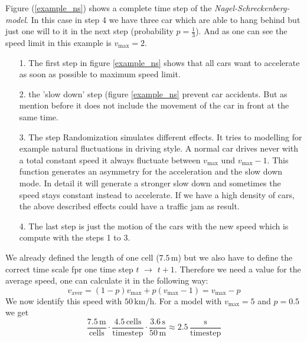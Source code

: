 \documentclass[11pt]{article}
\begin{document}
Figure (\ref{example_ns}) shows a complete time step of the \textit{Nagel-Schreckenberg-model}. In this case in step 4 we have three car which are able to hang behind but just one will to it in the next step (probability $p=\frac{1}{3}$). And as one can see the speed limit in this example is $v_\mathrm{max}=2$.
\begin{itemize}
\item[1.] The first step in figure \ref{example_ns} shows that all cars want to accelerate as soon as possible to maximum speed limit.
\item[2.] the 'slow down' step (figure \ref{example_ns} prevent car accidents. But as mention before it does not include the movement of the car in front at the same time.
\item[3.] The step Randomization simulates different effects. It tries to modelling for example natural fluctuations in driving style. A normal car drives never with a total constant speed it always fluctuate between $v_\mathrm{max}$ und $v_\mathrm{max}-1$. This function generates an asymmetry for the acceleration and the slow down mode. In detail it will generate a stronger slow down and sometimes the speed stays constant instead to accelerate. If we have a high density of cars, the above described effects could have a traffic jam as result.
\item[4.] The last step is just the motion of the cars with the new speed which is compute with the steps 1 to 3.

\end{itemize}
We already defined the length of one cell ($7.5\,\mathrm{m}$) but we also have to define the correct time scale fpr one time step $t$ $\rightarrow$ $t+1$. Therefore we need a value for the average speed, one can calculate it in the following way:\\

\begin{equation}
v_\mathrm{aver}=(1-p)v_\mathrm{max} + p(v_\mathrm{max}-1)=v_\mathrm{max}-p
\label{average_speed}
\end{equation}
We now identify this speed with $50\,\mathrm{km/h}$. For a model with $v_\mathrm{max}=5$ and $p=0.5$ we get\\
\begin{equation}
\frac{7.5\,\mathrm{m}}{\mathrm{cells}}\cdot\frac{4.5\,\mathrm{cells}}{\mathrm{timestep}} \cdot \frac{3.6\,\mathrm{s}}{50\,\mathrm{m}}\approx 2.5\,\frac{\mathrm{s}}{\mathrm{timestep}}
\end{equation}
\end{document}
